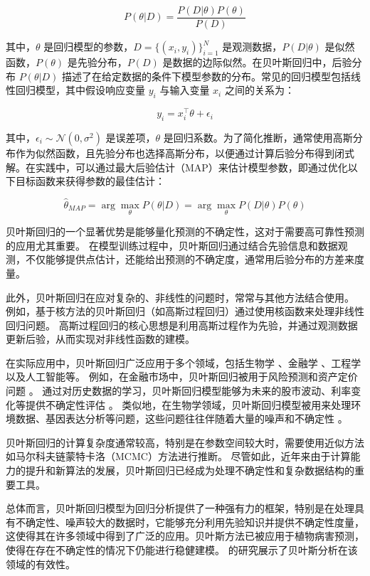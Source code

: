 \documentclass[AutoFakeBold]{LZUThesis-PgD&PhD}
\begin{document}
	\[
	P(\theta | D) = \frac{P(D | \theta) P(\theta)}{P(D)}
	\]
	
	其中，$\theta$ 是回归模型的参数，$D = \{(x_i, y_i)\}_{i=1}^N$ 是观测数据，$P(D | \theta)$ 是似然函数，$P(\theta)$ 是先验分布，$P(D)$ 是数据的边际似然。在贝叶斯回归中，后验分布 $P(\theta | D)$ 描述了在给定数据的条件下模型参数的分布。常见的回归模型包括线性回归模型，其中假设响应变量 $y_i$ 与输入变量 $x_i$ 之间的关系为：
	
	\[
	y_i = x_i^\top \theta + \epsilon_i
	\]
	
	其中，$\epsilon_i \sim \mathcal{N}(0, \sigma^2)$ 是误差项，$\theta$ 是回归系数。为了简化推断，通常使用高斯分布作为似然函数，且先验分布也选择高斯分布，以便通过计算后验分布得到闭式解。在实践中，可以通过最大后验估计（MAP）来估计模型参数，即通过优化以下目标函数来获得参数的最佳估计：
	
	\[
	\hat{\theta}_{MAP} = \arg\max_\theta P(\theta | D) = \arg\max_\theta P(D | \theta) P(\theta)
	\]
	
	贝叶斯回归的一个显著优势是能够量化预测的不确定性，这对于需要高可靠性预测的应用尤其重要。
	在模型训练过程中，贝叶斯回归通过结合先验信息和数据观测，不仅能够提供点估计，还能给出预测的不确定度，通常用后验分布的方差来度量。
	
	此外，贝叶斯回归在应对复杂的、非线性的问题时，常常与其他方法结合使用。
	例如，基于核方法的贝叶斯回归（如高斯过程回归）通过使用核函数来处理非线性回归问题。
	高斯过程回归的核心思想是利用高斯过程作为先验，并通过观测数据更新后验，从而实现对非线性函数的建模。
	
	在实际应用中，贝叶斯回归广泛应用于多个领域，包括生物学 \cite{biology_bayes}、金融学 \cite{finance_bayes}、工程学以及人工智能等。
	例如，在金融市场中，贝叶斯回归被用于风险预测和资产定价问题 \cite{finance_bayes_risk}。
	通过对历史数据的学习，贝叶斯回归模型能够为未来的股市波动、利率变化等提供不确定性评估 \cite{finance_bayes_volatility}。
	类似地，在生物学领域，贝叶斯回归模型被用来处理环境数据、基因表达分析等问题，这些问题往往伴随着大量的噪声和不确定性 \cite{biology_bayes_noise}。
	
	
	贝叶斯回归的计算复杂度通常较高，特别是在参数空间较大时，需要使用近似方法如马尔科夫链蒙特卡洛（MCMC）方法进行推断。
	尽管如此，近年来由于计算能力的提升和新算法的发展，贝叶斯回归已经成为处理不确定性和复杂数据结构的重要工具。
	
	总体而言，贝叶斯回归模型为回归分析提供了一种强有力的框架，特别是在处理具有不确定性、噪声较大的数据时，它能够充分利用先验知识并提供不确定性度量，这使得其在许多领域中得到了广泛的应用。贝叶斯方法已被应用于植物病害预测，使得在存在不确定性的情况下仍能进行稳健建模。\citet{yuen2002bayesian} 的研究展示了贝叶斯分析在该领域的有效性。
	
\end{document}
